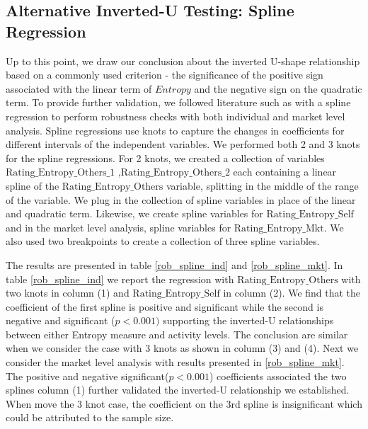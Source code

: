 
\subsection{Alternative Inverted-U Testing: Spline Regression}
Up to this point, we draw our conclusion about the inverted U-shape relationship based on a commonly used criterion - the significance of the positive sign associated with the linear term of $Entropy$ and the negative sign on the quadratic term. To provide further validation, we followed literature such as \cite{tan2019you,kesavan2014volume} with a spline regression to perform robustness checks with both individual and market level analysis. 
Spline regressions use knots to capture the changes in coefficients for different intervals of the independent variables. We performed both 2 and 3 knots for the spline regressions. For 2 knots, we created a collection of variables $\text{Rating\_Entropy\_Others\_1}$ ,$\text{Rating\_Entropy\_Others\_2}$   each containing a linear spline of the $\text{Rating\_Entropy\_Others}$ variable, splitting in the middle of the range of the variable. We plug in the collection of spline variables in place of the linear and quadratic term. Likewise, we create spline variables for $\text{Rating\_Entropy\_Self}$ and in the market level analysis, spline variables for $\text{Rating\_Entropy\_Mkt}$. We also used two breakpoints to create a collection of three spline variables. 

The results are presented in table \ref{rob_spline_ind} and \ref{rob_spline_mkt}. In table \ref{rob_spline_ind} we report the regression with  $\text{Rating\_Entropy\_Others}$ with two knots in column (1) and  $\text{Rating\_Entropy\_Self}$ in column (2). We find that the coefficient of the first spline is positive and significant while the second is negative and significant ($p<0.001)$ supporting the inverted-U relationships between either Entropy measure and activity levels. The conclusion are similar when we consider the case with 3 knots as shown in column (3) and (4).  Next we consider the market level analysis with results presented in \ref{rob_spline_mkt}. The positive and negative significant($p<0.001$) coefficients associated the two splines column (1) further validated the inverted-U relationship we established. When move the 3 knot case, the coefficient on the 3rd spline is insignificant which could be attributed to the sample size. 



